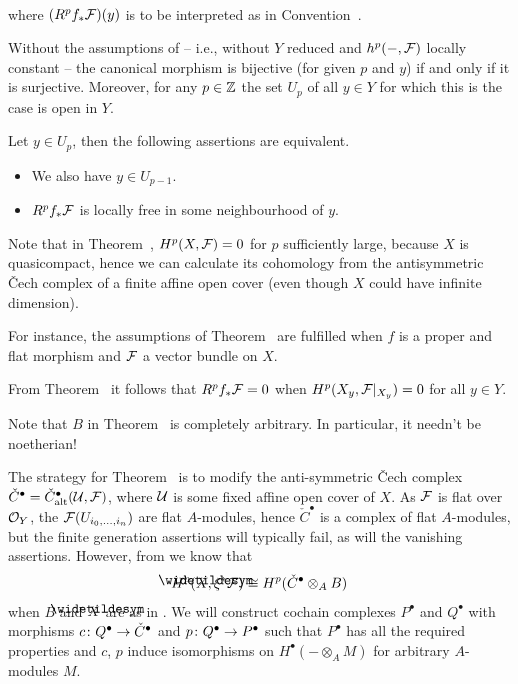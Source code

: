\documentclass[a4paper,parskip=half,numbers=enddot, DIV=12]{scrreprt}
\begin{document}
\begin{thm}
\begin{alphanumerate}
\begin{align}
		\end{align}
		where $(R^pf_*\mathcal{F})(y)$ is to be interpreted as in Convention~.
		\item Without the assumptions of  -- i.e., without $Y$ reduced and $h^p(-,\mathcal{F})$ locally constant -- the canonical morphism  is bijective (for given $p$ and $y$) if and only if it is surjective. Moreover, for any $p\in\mathbb{Z}$ the set $U_p$ of all $y\in Y$ for which this is the case is open in $Y$.
		\item Let $y\in U_p$, then the following assertions are equivalent.
		\begin{itemize}
			\item[\itememph{\alpha}] We also have $y\in U_{p-1}$.
			\item[\itememph{\beta}] $R^pf_*\mathcal{F}$ is locally free in some neighbourhood of $y$.
		\end{itemize}
	\end{alphanumerate}
\end{thm}
\begin{rem}
	\begin{alphanumerate}
		\item Note that in Theorem~, $H^p(X,\mathcal{F})=0$ for $p$ sufficiently large, because $X$ is quasicompact, hence we can calculate its cohomology from the antisymmetric \v Cech complex of a finite affine open cover (even though $X$ could have infinite dimension).
		\item For instance, the assumptions of Theorem~ are fulfilled when $f$ is a proper and flat morphism and $\mathcal{F}$ a vector bundle on $X$.
		\item From Theorem~ it follows that $R^pf_*\mathcal{F}=0$ when $H^p(X_y,\mathcal{F}|_{X_y})=0$ for all $y\in Y$.
		\item Note that $B$ in Theorem~ is completely arbitrary. In particular, it needn't be noetherian!
	\end{alphanumerate}
\end{rem}
	The strategy for Theorem~ is to modify the anti-symmetric \v Cech complex $\check{C}^\bullet=\check{C}_{\mathrm{alt}}^\bullet(\mathcal{U},\mathcal{F})$, where $\mathcal{U}$ is some fixed affine open cover of $X$. As $\mathcal{F}$ is flat over $\mathcal{O}_Y$, the $\mathcal{F}(U_{i_0,\ldots,i_n})$ are flat $A$-modules, hence $\check{C}^\bullet$ is a complex of flat $A$-modules, but the finite generation assertions will typically fail, as will the vanishing assertions. However, from  we know that
	\begin{align}\lbl{eq:baseChangeProperty}
		H^p(\snake{X},\xi^*\Ff)\cong H^p(\check{C}^\bullet\otimes_AB)
	\end{align}
	when $B$ and $\snake{X}$ are as in . We will construct cochain complexes $P^\bullet$ and $Q^\bullet$ with morphisms $c\colon Q^\bullet\morphism\check{C}^\bullet$ and $p\colon Q^\bullet\morphism P^\bullet$ such that $P^\bullet$ has all the required properties and $c$, $p$ induce isomorphisms on $H^\bullet(-\otimes_AM)$ for arbitrary $A$-modules $M$.
	
\end{document}
